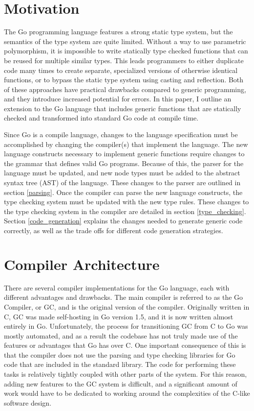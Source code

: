 \documentclass[letterpaper,twocolumn,11pt]{article}
\begin{document}
\section{Motivation} \label{motivation}

The Go programming language features a strong static type system, but the semantics of the type system are quite limited. Without a way to use parametric polymorphism, it is impossible to write statically type checked functions that can be reused for multiple similar types. This leads programmers to either duplicate code many times to create separate, specialized versions of otherwise identical functions, or to bypass the static type system using casting and reflection. Both of these approaches have practical drawbacks compared to generic programming, and they introduce increased potential for errors. In this paper, I outline an extension to the Go language that includes generic functions that are statically checked and transformed into standard Go code at compile time. 

Since Go is a compile language, changes to the language specification must be accomplished by changing the compiler(s) that implement the language. The new language constructs necessary to implement generic functions require changes to the grammar that defines valid Go programs. Because of this, the parser for the language must be updated, and new node types must be added to the abstract syntax tree (AST) of the language. These changes to the parser are outlined in section \ref{parsing}. Once the compiler can parse the new language constructs, the type checking system must be updated with the new type rules. These changes to the type checking system in the compiler are detailed in section \ref{type_checking}. Section \ref{code_generation} explains the changes needed to generate generic code correctly, as well as the trade offs for different code generation strategies. 

\section{Compiler Architecture} \label{architecture}

There are several compiler implementations for the Go language, each with different advantages and drawbacks. The main compiler is referred to as the Go Compiler, or GC, and is the original version of the compiler. Originally written in C, GC was made self-hosting in Go version 1.5, and it is now written almost entirely in Go. Unfortunately, the process for transitioning GC from C to Go was mostly automated, and as a result the codebase has not truly made use of the features or advantages that Go has over C. One important consequence of this is that the compiler does not use the parsing and type checking libraries for Go code that are included in the standard library. The code for performing these tasks is relatively tightly coupled with other parts of the system. For this reason, adding new features to the GC system is difficult, and a significant amount of work would have to be dedicated to working around the complexities of the C-like software design.
\end{document}
